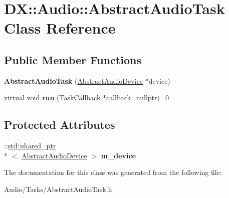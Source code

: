 \hypertarget{class_d_x_1_1_audio_1_1_abstract_audio_task}{\section{D\-X\-:\-:Audio\-:\-:Abstract\-Audio\-Task Class Reference}
\label{class_d_x_1_1_audio_1_1_abstract_audio_task}
}
\subsection*{Public Member Functions}
\begin{DoxyCompactItemize}
\item 
\hypertarget{class_d_x_1_1_audio_1_1_abstract_audio_task_abcfc1d6d6e9ce76cdb756f6b59e9980b}{{\bfseries Abstract\-Audio\-Task} (\hyperlink{class_d_x_1_1_audio_1_1_abstract_audio_device}{Abstract\-Audio\-Device} $\ast$device)}\label{class_d_x_1_1_audio_1_1_abstract_audio_task_abcfc1d6d6e9ce76cdb756f6b59e9980b}

\item 
\hypertarget{class_d_x_1_1_audio_1_1_abstract_audio_task_ac9e16dcb6c9b23e0703c1e3556b90a87}{virtual void {\bfseries run} (\hyperlink{class_d_x_1_1_audio_1_1_task_callback}{Task\-Callback} $\ast$callback=nullptr)=0}\label{class_d_x_1_1_audio_1_1_abstract_audio_task_ac9e16dcb6c9b23e0703c1e3556b90a87}

\end{DoxyCompactItemize}
\subsection*{Protected Attributes}
\begin{DoxyCompactItemize}
\item 
\hypertarget{class_d_x_1_1_audio_1_1_abstract_audio_task_a23ae17b2ecc403da3cfbd8d2c6ff527a}{\-::\hyperlink{classstd_1_1shared__ptr}{std\-::shared\-\_\-ptr}\\*
$<$ \hyperlink{class_d_x_1_1_audio_1_1_abstract_audio_device}{Abstract\-Audio\-Device} $>$ {\bfseries m\-\_\-device}}\label{class_d_x_1_1_audio_1_1_abstract_audio_task_a23ae17b2ecc403da3cfbd8d2c6ff527a}

\end{DoxyCompactItemize}


The documentation for this class was generated from the following file\-:\begin{DoxyCompactItemize}
\item 
Audio/\-Tasks/Abstract\-Audio\-Task.\-h\end{DoxyCompactItemize}
